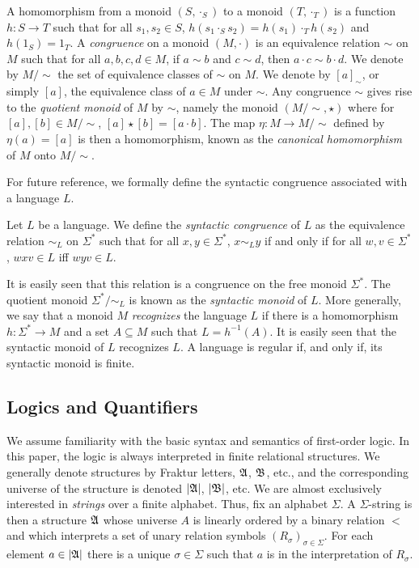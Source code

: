 \documentclass[a4paper,UKenglish,cleveref, autoref, thm-restate, anonymous]{lipics-v2021}
\begin{document}
A homomorphism from a monoid $(S, \cdot_S)$ to a monoid $(T, \cdot_T)$ is a function $h : S \rightarrow T$ such that for all $s_1, s_2 \in S$, $h(s_1 \cdot_S s_2) = h(s_1) \cdot_T h(s_2)$ and $h(1_S) = 1_T$.     A \emph{congruence} on a monoid $(M, \cdot)$ is an equivalence relation $\sim$ on $M$ such that for all $a,b,c,d \in M$, if $a \sim b$ and $c \sim d$, then $a \cdot c \sim b \cdot d$.  We denote by $M/{\sim}$ the set of equivalence classes of $\sim$ on $M$.  We denote by $[a]_{\sim}$, or simply $[a]$, the equivalence class of $a \in M$ under $\sim$.  Any congruence $\sim$ gives rise to the \emph{quotient monoid} of $M$ by $\sim$, namely the monoid $(M/{\sim}, \star)$ where for $[a],[b] \in M/{\sim}$, $[a] \star [b] = [a \cdot b]$.  The map $\eta : M \rightarrow M/{\sim}$ defined by $\eta(a) = [a]$ is then a homomorphism, known as the  \emph{canonical homomorphism} of $M$ onto $M/{\sim}$.

For future reference, we formally define the syntactic congruence associated with a language $L$.
\begin{definition}\label{def:syncong}
    Let $L$ be a language. We define the \emph{syntactic congruence} of $L$ as the equivalence relation $\sim_L$ on $\Sigma^*$ such that for all $x, y \in \Sigma^*$, $x \sim_L y$ if and only if for all $w,v \in \Sigma^*$, $wxv \in L$ iff $wyv \in L$.
  \end{definition}
 It is easily seen that this relation is a congruence on the free monoid $\Sigma^*$.  The quotient monoid $\Sigma^*/{\sim_L}$ is known as the \emph{syntactic monoid} of $L$.  More generally, we say that a monoid $M$ \emph{recognizes} the language $L$ if there is a homomorphism $h: \Sigma^* \rightarrow M$ and a set $A \subseteq M$ such that $L = h^{-1}(A)$.  It is easily seen that the syntactic monoid of $L$ recognizes $L$.  A language is regular if, and only if, its syntactic monoid is finite.

\subsection{Logics and Quantifiers}\label{sec:backgroundmult}

We assume familiarity with the basic syntax and semantics of first-order logic.  In this paper, the logic is always interpreted in finite relational structures.  We generally denote structures by Fraktur letters, $\mathfrak{A}$, $\mathfrak{B}$, etc., and the corresponding universe of the structure is denoted $|\mathfrak{A}|$, $|\mathfrak{B}|$, etc.
We are almost exclusively interested in \emph{strings} over a finite alphabet.  Thus, fix an alphabet $\Sigma$.  A $\Sigma$-string is then a structure $\mathfrak{A}$ whose universe $A$ is linearly ordered by a binary relation $<$ and which interprets a set of unary relation symbols $(R_{\sigma})_{\sigma \in \Sigma}$.  For each element $a \in |\mathfrak{A}|$ there is a unique $\sigma \in \Sigma$ such that $a$ is in the interpretation of $R_{\sigma}$.
\end{document}
